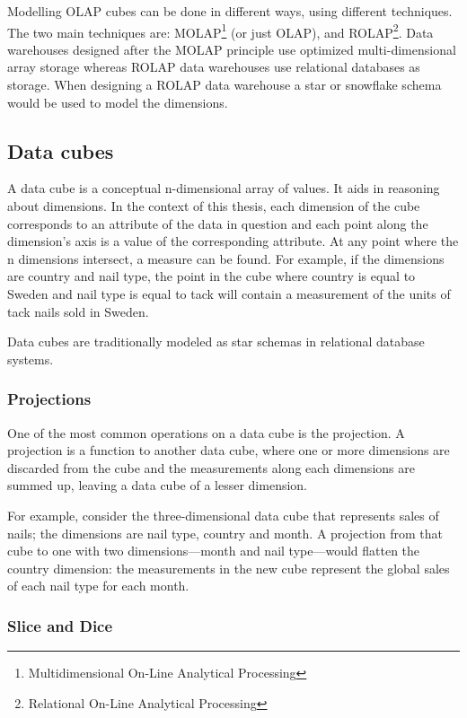 Modelling OLAP cubes can be done in different ways, using different techniques.
The two main techniques are: MOLAP\footnote{Multidimensional On-Line Analytical
Processing} (or just OLAP), and ROLAP\footnote{Relational On-Line Analytical
Processing}. Data warehouses designed after the MOLAP principle use optimized
multi-dimensional array storage whereas ROLAP data warehouses use relational
databases as storage. When designing a ROLAP data warehouse a star or snowflake
schema would be used to model the dimensions.


\subsection*{Data cubes}

A data cube is a conceptual n-dimensional array of values. It aids in
reasoning about dimensions. In the context of this thesis, each dimension of
the cube corresponds to an attribute of the data in question and each point
along the dimension's axis is a value of the corresponding attribute. At any
point where the n dimensions intersect, a measure can be found. For example,
if the dimensions are country and nail type, the point in the cube where
country is equal to Sweden and nail type is equal to tack will contain a
measurement of the units of tack nails sold in Sweden.

Data cubes are traditionally modeled as star schemas in relational database
systems. \cite{olap_solutions}


\subsubsection*{Projections}

One of the most common operations on a data cube is the projection. A
projection is a function to another data cube, where one or more dimensions
are discarded from the cube and the measurements along each dimensions are
summed up, leaving a data cube of a lesser dimension.

For example, consider the three-dimensional data cube that represents sales of
nails; the dimensions are nail type, country and month. A projection from that
cube to one with two dimensions---month and nail type---would flatten the
country dimension: the measurements in the new cube represent the global sales
of each nail type for each month.


\subsubsection*{Slice and Dice}

